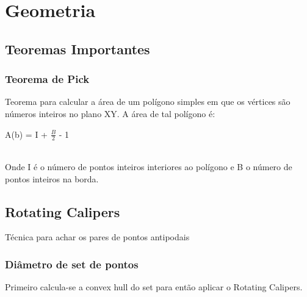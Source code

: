 \section{Geometria}

\subsection{Teoremas Importantes}

\subsubsection{Teorema de Pick}
Teorema para calcular a \'{a}rea de um pol\'{i}gono simples em que os v\'{e}rtices são n\'{u}meros inteiros no plano XY. A \'{a}rea de tal pol\'{i}gono é: 
\\\centerline{A(b) = I + $\frac{B}{2}$ - 1}
\\Onde I \'{e} o n\'{u}mero de pontos inteiros interiores ao pol\'{i}gono e B o n\'{u}mero de pontos inteiros na borda.

\divisor

\subsection{Rotating Calipers}

T\'{e}cnica para achar os pares de pontos antipodais
\subsubsection{Di\^{a}metro de set de pontos}
Primeiro calcula-se a convex hull do set para ent\~{a}o aplicar o Rotating Calipers.
\divisor
